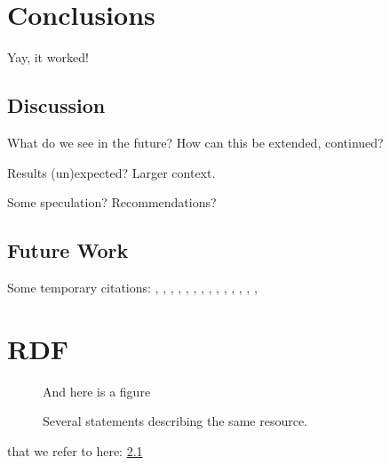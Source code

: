 \documentclass[a4paper,11pt]{kth-mag}
\begin{document}
\pagestyle{newchap}
\chapter{Conclusions}
Yay, it worked!


\section{Discussion}

What do we see in the future? How can this be extended, continued?

Results (un)expected? Larger context.

Some speculation? Recommendations?

\section{Future Work}


Some temporary citations:
\cite{hoare69}, \cite{floyd67}, \cite{pnueli77},
\cite{leucker09abriefaccount}, \cite{bauer06monitoring}, \cite{bauer08goodbadugly}, \cite{delgado04taxonomy}, \cite{meyer92applyingdbc},
\cite{rosenblum95practicalassertions}, \cite{bartetzko01jass},
\cite{bodden04lightweightltl}, \cite{bodden05efficientrv},
\cite{becksmalltalktesting}, \cite{fowlerxunit},
\cite{matusiak09aoppy}












\appendix
\addappheadtotoc
\chapter{RDF}\label{appA}

\begin{figure}[ht]
\begin{center}
And here is a figure
\caption{\small{Several statements describing the same resource.}}\label{RDF_4}
\end{center}
\end{figure}

that we refer to here: \ref{RDF_4}
\end{document}
